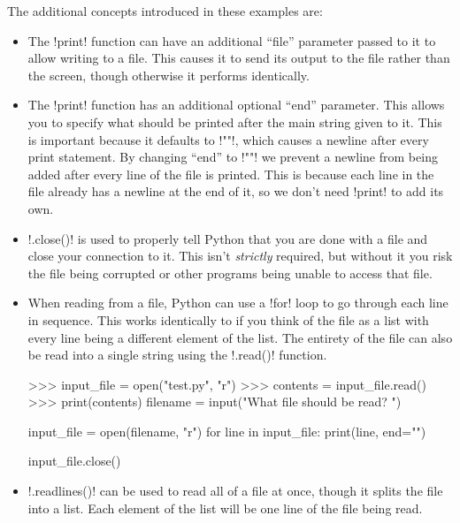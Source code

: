 \documentclass[11pt]{cselabheader}
\begin{document}
The additional concepts introduced in these examples are:

\begin{itemize}
\item The \pythoninline!print! function can have an additional ``file'' parameter
  passed to it to allow writing to a file. This causes it to send its output to
  the file rather than the screen, though otherwise it performs identically.

\item The \pythoninline!print! function has an additional optional ``end''
  parameter. This allows you to specify what should be printed after the main
  string given to it. This is important because it defaults to \pythoninline!"\n"!,
  which causes a newline after every print statement. By changing ``end'' to
  \pythoninline!""! we prevent a newline from being added after every line of the
  file is printed. This is because each line in the file already has a newline
  at the end of it, so we don't need \pythoninline!print! to add its own.

\item \pythoninline!.close()! is used to properly tell Python that you are done
  with a file and close your connection to it. This isn't \emph{strictly}
  required, but without it you risk the file being corrupted or other programs
  being unable to access that file.

\item When reading from a file, Python can use a \pythoninline!for! loop to go
  through each line in sequence. This works identically to if you think of the
  file as a list with every line being a different element of the list. The
  entirety of the file can also be read into a single string using the
  \pythoninline!.read()! function.

\begin{pyconcode}
>>> input_file = open("test.py", "r")
>>> contents = input_file.read()
>>> print(contents)
filename = input("What file should be read? ")

input_file = open(filename, "r")
for line in input_file:
  print(line, end="")

input_file.close()
\end{pyconcode}

\item \pythoninline!.readlines()! can be used to read all of a file at once, though
  it splits the file into a list. Each element of the list will be one line of
  the file being read.
\end{itemize}
\end{document}
